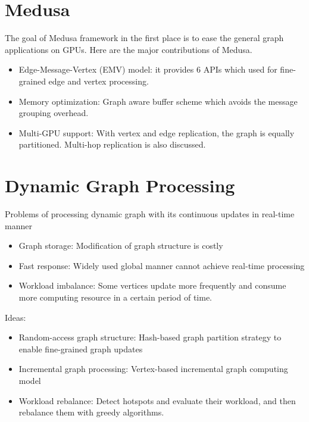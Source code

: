 \section{Medusa}
The goal of Medusa framework in the first place is to ease the general graph applications on GPUs.
Here are the major contributions of Medusa.
\begin{itemize}
    \item Edge-Message-Vertex (EMV) model: it provides 6 APIs which used for fine-grained edge and vertex processing.
    \item Memory optimization: Graph aware buffer scheme which avoids the message grouping overhead. 
    \item Multi-GPU support: With vertex and edge replication, the graph is equally partitioned. Multi-hop replication is also discussed. 
\end{itemize}

\section{Dynamic Graph Processing}
Problems of processing dynamic graph with its continuous updates in real-time manner
\begin{itemize}
\item Graph storage: Modification of graph structure is costly
\item Fast response: Widely used global manner cannot achieve real-time processing
\item Workload imbalance: Some vertices update more frequently and consume more computing resource in a certain period of time.
\end{itemize}

Ideas:
\begin{itemize}
\item Random-access graph structure: Hash-based graph partition strategy to enable fine-grained graph updates
\item Incremental graph processing: Vertex-based incremental graph computing model
\item Workload rebalance: Detect hotspots and evaluate their workload, and then rebalance them with greedy algorithms.
\end{itemize}
